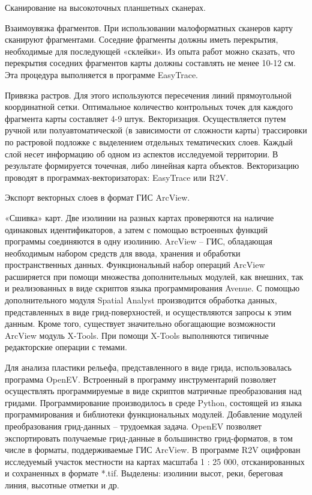 \documentclass[runningheads]{AIIT}
\begin{document}
Сканирование на высокоточных планшетных сканерах.

Взаимоувязка  фрагментов. При использовании малоформатных сканеров карту сканируют фрагментами. Соседние фрагменты должны иметь перекрытия, необходимые для последующей «склейки». Из опыта работ можно сказать, что перекрытия соседних фрагментов карты должны составлять не менее 10-12 см. Эта процедура выполняется в программе EasyTrace.

Привязка растров. Для этого используются пересечения линий прямоугольной координатной сетки. Оптимальное количество контрольных точек для каждого фрагмента карты составляет 4-9 штук.
Векторизация. Осуществляется путем ручной или полуавтоматической (в зависимости от сложности карты) трассировки по растровой подложке с выделением отдельных тематических слоев. Каждый слой несет информацию об одном из аспектов исследуемой территории. В результате формируется точечная, либо линейная карта объектов. Векторизацию проводят в программах-векторизаторах: EasyTrace или R2V.

Экспорт векторных слоев в формат ГИС ArcView.

«Сшивка» карт. Две изолинии на разных картах проверяются на наличие одинаковых идентификаторов, а затем с помощью встроенных функций программы соединяются в одну изолинию.
ArcView – ГИС, обладающая необходимым набором средств для ввода, хранения и обработки пространственных данных. Функциональный набор операций ArcView расширяется при помощи множества дополнительных модулей, как внешних, так и реализованных в виде скриптов языка программирования Avenue. С помощью дополнительного модуля Spatial Analyst производится обработка данных, представленных в виде грид-поверхностей, и осуществляются запросы к этим данным. Кроме того, существует значительно обогащающие возможности ArcView модуль X-Tools. При помощи X-Tools выполняются типичные редакторские операции с темами.

Для анализа пластики рельефа, представленного в виде грида, использовалась программа OpenEV. Встроенный в программу инструментарий позволяет осуществлять программируемые в виде скриптов матричные преобразования над гридами. Программирование производилось в среде Python, состоящей из языка программирования и библиотеки функциональных модулей. Добавление модулей преобразования грид-данных – трудоемкая задача. OpenEV позволяет экспортировать получаемые грид-данные в большинство грид-форматов, в том числе в форматы, поддерживаемые ГИС ArcView.
В программе R2V оцифрован исследуемый участок местности на картах масштаба  1 : 25 000, отсканированных и сохраненных в формате *.tif. Выделены: изолинии высот, реки, береговая линия, высотные отметки и др.
\end{document}
